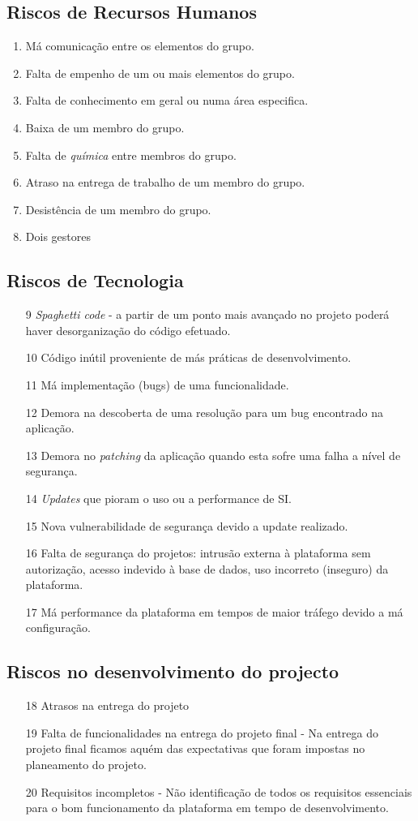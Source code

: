 \documentclass[12pt, a4paper, twoside]{report} %
\begin{document}
\clearpage
\subsection{Riscos de Recursos Humanos}
\begin{enumerate}
\item Má comunicação entre os elementos do grupo.
\item Falta de empenho de um ou mais elementos do grupo.
\item Falta de conhecimento em geral ou numa área especifica.
\item Baixa de um membro do grupo.
\item Falta de \textit{química} entre membros do grupo.
\item Atraso na entrega de trabalho de um membro do grupo.
\item Desistência de um membro do grupo.
\item Dois gestores
\end{enumerate}
\subsection{Riscos de Tecnologia}
\begin{enumerate}
\item [9] \textit{Spaghetti code} - a partir de um ponto mais avançado no projeto poderá haver desorganização do código efetuado.
\item [10] Código inútil proveniente de más práticas de desenvolvimento.
\item [11] Má implementação (bugs) de uma funcionalidade.
\item [12] Demora na descoberta de uma resolução para um bug encontrado na aplicação.
\item [13] Demora no \textit{patching} da aplicação quando esta sofre uma falha a nível de segurança.
\item [14] \textit{Updates} que pioram o uso ou a performance de SI.
\item [15] Nova vulnerabilidade de segurança devido a update realizado.
\item [16] Falta de segurança do projetos: intrusão externa à plataforma sem autorização, acesso indevido à base de dados, uso incorreto (inseguro) da plataforma.
\item [17] Má performance da plataforma em tempos de maior tráfego devido a má configuração.
\end{enumerate}
\subsection{Riscos no desenvolvimento do projecto}
\begin{enumerate}
\item [18] Atrasos na entrega do projeto
\item [19] Falta de funcionalidades na entrega do projeto final - Na entrega do projeto final ficamos aquém das expectativas que foram impostas no planeamento do projeto.
\item [20] Requisitos incompletos - Não identificação de todos os requisitos essenciais para o bom funcionamento da plataforma em tempo de desenvolvimento.
\end{enumerate}
\end{document}
